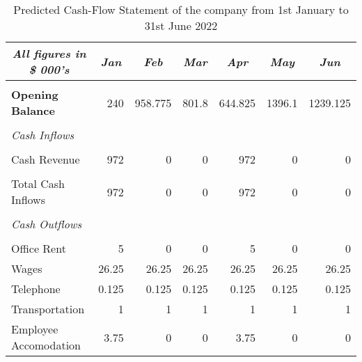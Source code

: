 \begin{table}[H]
  \centering
  \caption{Predicted Cash-Flow Statement of the company from 1st January to 31st June 2022}
    \begin{tabular}{|l|r|r|r|r|r|r|}
    \toprule
    \hline
    \hline
    \multicolumn{1}{|c|}{\textit{\textbf{All figures in \$ 000's}}} & \multicolumn{1}{c|}{\textit{\textbf{Jan}}} & \multicolumn{1}{c|}{\textit{\textbf{Feb}}} & \multicolumn{1}{c|}{\textit{\textbf{Mar}}} & \multicolumn{1}{c|}{\textit{\textbf{Apr}}} & \multicolumn{1}{c|}{\textit{\textbf{May }}} & \multicolumn{1}{c|}{\textit{\textbf{Jun}}} \\
    \midrule
    \hline
    \hline
          &       &       &       &       &       &  \\
    \midrule
    \textbf{Opening Balance} & 240   & 958.775 & 801.8 & 644.825 & 1396.1 & 1239.125 \\
    \midrule
          &       &       &       &       &       &  \\
    \midrule
    \textit{Cash Inflows} &       &       &       &       &       &  \\
    \midrule
          &       &       &       &       &       &  \\
    \midrule
    Cash Revenue & 972   & 0     & 0     & 972   & 0     & 0 \\
    \midrule
          &       &       &       &       &       &  \\
    \midrule
    Total Cash Inflows & 972   & 0     & 0     & 972   & 0     & 0 \\
    \midrule
          &       &       &       &       &       &  \\
    \midrule
    \textit{Cash Outflows} &       &       &       &       &       &  \\
    \midrule
          &       &       &       &       &       &  \\
    \midrule
    Office Rent  & 5     & 0     & 0     & 5     & 0     & 0 \\
    \midrule
    Wages & 26.25 & 26.25 & 26.25 & 26.25 & 26.25 & 26.25 \\
    \midrule
    Telephone & 0.125 & 0.125 & 0.125 & 0.125 & 0.125 & 0.125 \\
    \midrule
    Transportation & 1     & 1     & 1     & 1     & 1     & 1 \\
    \midrule
    Employee Accomodation & 3.75  & 0     & 0     & 3.75  & 0     & 0 \\

\end{tabular}
\end{table}
